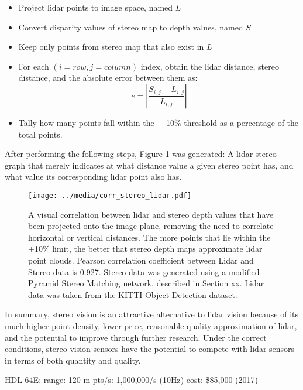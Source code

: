 \begin{itemize} \itemsep=-0.5em
    \item Project lidar points to image space, named $L$
    \item Convert disparity values of stereo map to depth values, named $S$
    \item Keep only points from stereo map that also exist in $L$
    \item For each $(i=row,j=column)$ index, obtain the lidar distance, stereo distance, and the absolute error between them as:
\begin{equation}
    e = \left | \frac{S_{i,j} - L_{i,j}}{L_{i,j}} \right |
    \label{eq_errCalc}
\end{equation}
    \item Tally how many points fall within the $\pm$ 10\% threshold as a percentage of the total points.
\end{itemize}

After performing the following steps, Figure \ref{corr_disp_lidar} was generated: A lidar-stereo graph that merely indicates at what distance value a given stereo point has, and what value its corresponding lidar point also has. 

\begin{figure}[h]
	\centering
	\texttt{[image: ../media/corr\_stereo\_lidar.pdf]}
	\caption{A visual correlation between lidar and stereo depth values that have been projected onto the image plane, removing the need to correlate horizontal or vertical distances. The more points that lie within the $\pm$10\% limit, the better that stereo depth maps approximate lidar point clouds. Pearson correlation coefficient between Lidar and Stereo data is 0.927. Stereo data was generated using a modified Pyramid Stereo Matching network, described in Section xx. Lidar data was taken from the KITTI Object Detection dataset.}
	\label{corr_disp_lidar}
\end{figure}
 
In summary, stereo vision is an attractive alternative to lidar vision because of its much higher point density, lower price, reasonable quality approximation of lidar, and the potential to improve through further research. Under the correct conditions, stereo vision sensors have the potential to compete with lidar sensors in terms of both quantity and quality.

HDL-64E:
range: 120 m
pts/s: 1,000,000/s (10Hz)
cost: \$85,000 (2017)





